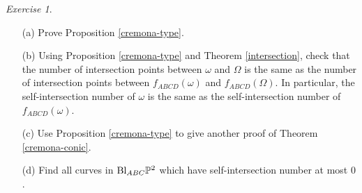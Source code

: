 \documentclass[letterpaper,11pt]{article}
\theoremstyle{definition}
\theoremstyle{remark}
\newtheorem{exer}{Exercise}
\begin{document}
\begin{exer}
\begin{itemize}
\item[(a)] Prove Proposition \ref{cremona-type}.

\item[(b)] Using Proposition \ref{cremona-type} and Theorem \ref{intersection}, check that the number of intersection points between $\omega$ and $\Omega$ is the same as the number of intersection points between $f_{ABCD}(\omega)$ and $f_{ABCD}(\Omega)$. In particular, the self-intersection number of $\omega$ is the same as the self-intersection number of $f_{ABCD}(\omega)$.

\item[(c)] Use Proposition \ref{cremona-type} to give another proof of Theorem \ref{cremona-conic}.

\item[(d)] Find all curves in $\text{\rm Bl}_{ABC}\mathbb{P}^2$ which have self-intersection number at most $0$.
\end{itemize}
\end{exer}









\end{document}
